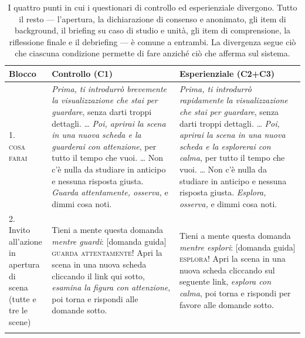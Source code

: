 \begin{table}[tbp]
\centering
\caption[Punti di differenza tra le varianti di controllo ed esperienziale]{I quattro punti in cui i
questionari di controllo ed esperienziale divergono. Tutto il resto --- l'apertura, la dichiarazione
di consenso e anonimato, gli item di background, il briefing su caso di studio e unità, gli item di
comprensione, la riflessione finale e il debriefing --- è comune a entrambi. La divergenza segue ciò
che ciascuna condizione permette di fare anziché ciò che afferma sul sistema.}
\label{tab:b-differences}
\footnotesize
\renewcommand{\arraystretch}{1.25}
\begin{tabularx}{\textwidth}{@{}p{2.3cm} X X@{}}
\toprule
\textbf{Blocco} & \textbf{Controllo (C1)} & \textbf{Esperienziale (C2+C3)} \\
\midrule

\makecell[l]{1.\\\textsc{cosa}\\\textsc{farai}} &
\emph{Prima, ti introdurrò brevemente la visualizzazione che stai per guardare}, senza darti troppi
dettagli. \dots{} \emph{Poi, aprirai la scena in una nuova scheda e la guarderai con attenzione}, per
tutto il tempo che vuoi. \dots{} Non c'è nulla da studiare in anticipo e nessuna risposta giusta.
\emph{Guarda attentamente, osserva,} e dimmi cosa noti. &
\emph{Prima, ti introdurrò rapidamente la visualizzazione che stai per guardare}, senza darti troppi
dettagli. \dots{} \emph{Poi, aprirai la scena in una nuova scheda e la esplorerai con calma}, per
tutto il tempo che vuoi. \dots{} Non c'è nulla da studiare in anticipo e nessuna risposta giusta.
\emph{Esplora, osserva,} e dimmi cosa noti. \\
\addlinespace

\makecell[l]{2.\\Invito all'azione\\in apertura di\\scena (tutte e\\tre le scene)} &
Tieni a mente questa domanda \emph{mentre guardi}: [domanda guida] \newline
\textsc{guarda attentamente!} \newline
Apri la scena in una nuova scheda cliccando il link qui sotto, \emph{esamina la figura con
attenzione}, poi torna e rispondi alle domande sotto. &
Tieni a mente questa domanda \emph{mentre esplori}: [domanda guida] \newline
\textsc{esplora!} \newline
Apri la scena in una nuova scheda cliccando sul seguente link, \emph{esplora con calma}, poi torna e
rispondi per favore alle domande sotto. \\
\addlinespace


\end{tabularx}
\end{table}
